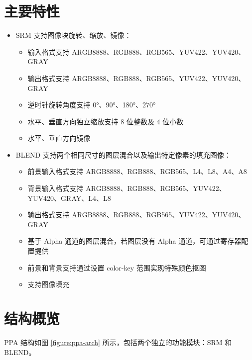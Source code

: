 \documentclass[main\_\_CN.tex]{subfiles}
\begin{document}

\section{主要特性}

\begin{itemize}
    \item SRM 支持图像块旋转、缩放、镜像：
        \begin{itemize}
            \item 输入格式支持 ARGB8888、RGB888、RGB565、YUV422、YUV420、GRAY
            \item 输出格式支持 ARGB8888、RGB888、RGB565、YUV422、YUV420、GRAY
            \item 逆时针旋转角度支持 0°、90°、180°、270°
            \item 水平、垂直方向独立缩放支持 8 位整数及 4 位小数
            \item 水平、垂直方向镜像
        \end{itemize}
    \item BLEND 支持两个相同尺寸的图层混合以及输出特定像素的填充图像：
        \begin{itemize}
            \item 前景输入格式支持 ARGB8888、RGB888、RGB565、L4、L8、A4、A8
            \item 背景输入格式支持 ARGB8888、RGB888、RGB565、YUV422、YUV420、GRAY、L4、L8
            \item 输出格式支持 ARGB8888、RGB888、RGB565、YUV422、YUV420、GRAY
            \item 基于 Alpha 通道的图层混合，若图层没有 Alpha 通道，可通过寄存器配置提供
            \item 前景和背景支持通过设置 color-key 范围实现特殊颜色抠图
            \item 支持图像填充
        \end{itemize}
\end{itemize}




\section{结构概览}
\label{sec:ppa-arch-overview}

PPA 结构如图 \ref{figure:ppa-arch} 所示，包括两个独立的功能模块：SRM 和 BLEND。
\end{document}

